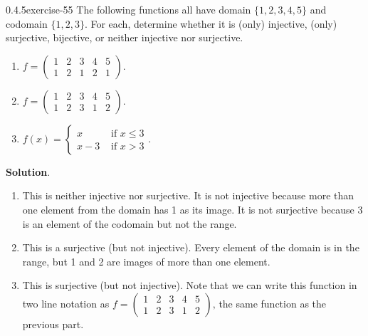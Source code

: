 \documentclass[twoside,11pt,]{book}
\numberwithin{equation}{chapter}
\newcommand{\twoline}[2]{\begin{pmatrix}#1 \\ #2 \end{pmatrix}}
\newcommand{\gt}{>}
\newcommand{\amp}{&}
\begin{document}
\begin{divisionsolution}{0.4.5}{}{exercise-55}%
\hypertarget{p-967}{}%
The following functions all have domain \(\{1,2,3,4,5\}\) and codomain \(\{1,2,3\}\text{.}\) For each, determine whether it is (only) injective, (only) surjective, bijective, or neither injective nor surjective.\leavevmode%
\begin{enumerate}[label=(\alph*)]
\item\hypertarget{li-791}{}\hypertarget{p-968}{}%
\(f = \twoline{1 \amp 2 \amp 3 \amp 4 \amp 5}{1 \amp 2 \amp 1 \amp 2 \amp 1}\text{.}\) %
\item\hypertarget{li-797}{}\hypertarget{p-969}{}%
\(f = \twoline{1 \amp 2 \amp 3 \amp 4 \amp 5}{1 \amp 2 \amp 3 \amp 1 \amp 2}\text{.}\) %
\item\hypertarget{li-803}{}\hypertarget{p-970}{}%
\(f(x) = \begin{cases} x \amp \text{ if } x \le 3 \\ x-3 \amp \text{ if } x \gt 3\end{cases}\text{.}\) %
\end{enumerate}
%
\par\smallskip%
\noindent\textbf{Solution}.\quad%
\hypertarget{p-971}{}%
\leavevmode%
\begin{enumerate}[label=(\alph*)]
\item\hypertarget{li-809}{}\hypertarget{p-972}{}%
This is neither injective nor surjective. It is not injective because more than one element from the domain has 1 as its image. It is not surjective because 3 is an element of the codomain but not the range.%
\item\hypertarget{li-810}{}\hypertarget{p-973}{}%
This is a surjective (but not injective). Every element of the domain is in the range, but 1 and 2 are images of more than one element.%
\item\hypertarget{li-811}{}\hypertarget{p-974}{}%
This is surjective (but not injective). Note that we can write this function in two line notation as \(f = \twoline{1 \amp 2 \amp 3 \amp 4 \amp 5}{1 \amp 2 \amp 3 \amp 1 \amp 2}\text{,}\) the same function as the previous part.%
\end{enumerate}
%
\end{divisionsolution}%
\end{document}
